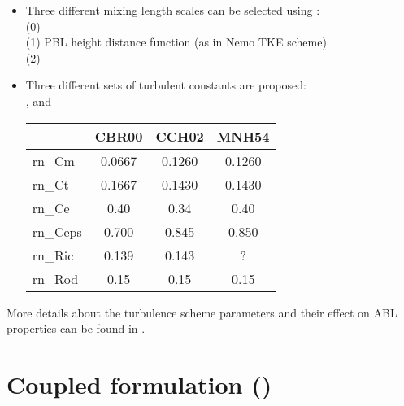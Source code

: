 \documentclass[../main/NEMO_manual]{subfiles}
\begin{document}
\begin{itemize}

  \item Three different mixing length scales can be selected using :\\
    (0) \citet{deardorff.ea_BLM80}\\
    (1) PBL height distance function (as in Nemo TKE scheme)\\
    (2) \citet{bougeault.lacarrere_MWR89}\\
  \item Three different sets of turbulent constants are proposed:\\
    \citet{cuxart.bougeault_QJRMS00}, \citet{cheng.canuto.ea_JAS02} and \citet{lac.chaboureau.ea_GMD18}\\

  \begin{table}[htbp]
    \centering
    \begin{tabular}{|l|c|c|c|}
      \hline
               & CBR00  & CCH02  & MNH54  \\
      \hline
      rn\_Cm   & 0.0667 & 0.1260 & 0.1260 \\
      \hline
      rn\_Ct   & 0.1667 & 0.1430 & 0.1430 \\
      \hline
      rn\_Ce   & 0.40   & 0.34   & 0.40   \\
      \hline
      rn\_Ceps & 0.700  & 0.845  & 0.850  \\
      \hline
      rn\_Ric  & 0.139  & 0.143  &   ?    \\
      \hline
      rn\_Rod  & 0.15   & 0.15   & 0.15   \\
      \hline
      \end{tabular}
  \end{table}

\end{itemize}

More details about the turbulence scheme parameters and their effect on ABL properties can be found in \citet{lemarie.samson.ea_GMD21}. 


\section[Coupled formulation (\textit{sbccpl.F90})]{Coupled formulation (\protect{})}
\label{sec:SBC_cpl}

\begin{listing}
  \caption{}
  \label{lst:namsbc_cpl}
\end{listing}
\end{document}
